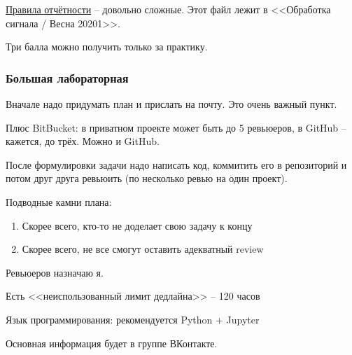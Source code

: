 \documentclass[main.tex]{subfiles}
\begin{document}
\href{https://docs.google.com/spreadsheets/d/1CrtpI9oEBldscjZSrAinBPnJN01S5UECVl5VxgtM_ic/edit#gid=2040984582}{Правила отчётности} -- довольно сложные.
Этот файл лежит в <<Обработка сигнала / Весна 20201>>.

Три балла можно получить только за практику.

\subsubsection{Большая лабораторная}

Вначале надо придумать план и прислать на почту.
Это очень важный пункт.

Плюс BitBucket: в приватном проекте может быть до 5 ревьюеров, в GitHub -- кажется, до трёх.
Можно и GitHub.

После формулировки задачи надо написать код, коммитить его в репозиторий и потом друг друга ревьюить (по несколько ревью на один проект).


Подводные камни плана:
\begin{enumerate}[noitemsep]
    \item Скорее всего, кто-то не доделает свою задачу к концу
    \item Скорее всего, не все смогут оставить адекватный review
\end{enumerate}

Ревьюеров назначаю я.

Есть <<неиспользованный лимит дедлайна>> -- 120 часов %

Язык программирования: рекомендуется Python + Jupyter

Основная информация будет в группе ВКонтакте.
\end{document}
